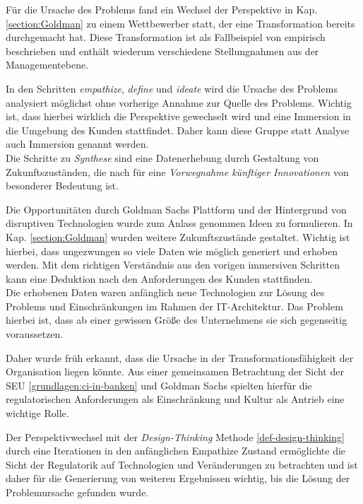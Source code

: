 Für die Ursache des Problems fand ein Wechsel der Perspektive in Kap. \ref{section:Goldman} zu einem Wettbewerber statt, der eine Transformation bereits durchgemacht hat. Diese Transformation ist als Fallbeispiel von \citet{Gupta:2017} empirisch beschrieben und enthält wiederum verschiedene Stellungnahmen aus der Managementebene.

In den Schritten \emph{empathize}, \emph{define} und \emph{ideate} wird die Ursache des Problems analysiert möglichst ohne vorherige Annahme zur Quelle des Problems. Wichtig ist, dass hierbei wirklich die Perspektive gewechselt wird und eine Immersion in die Umgebung des Kunden stattfindet. Daher kann diese Gruppe statt Analyse \cite{yüksel:digit} auch Immersion genannt werden. 
\medskip
\\
Die Schritte zu \emph{Synthese} sind eine Datenerhebung \cite[S. 61]{yüksel:digit} durch Gestaltung von Zukunftszuständen, die nach \citet[S. 14]{Alt2017} für eine \emph{Vorwegnahme künftiger Innovationen} von besonderer Bedeutung ist. 

Die Opportunitäten durch Goldman Sachs Plattform \cite{Gupta:2017} und der Hintergrund von disruptiven Technologien \cite{Fernandez:2020} wurde zum Anlass genommen Ideen zu formulieren. In Kap. \ref{section:Goldman} wurden weitere Zukunftszustände gestaltet.
Wichtig ist hierbei, dass ungezwungen so viele Daten wie möglich generiert und erhoben werden. Mit dem richtigen Verständnis aus den vorigen immersiven Schritten kann eine Deduktion nach den Anforderungen des Kunden stattfinden. 
\medskip
\\
Die erhobenen Daten waren anfänglich neue Technologien zur Lösung des Problems und Einschränkungen im Rahmen der IT-Architektur. Das Problem hierbei ist, dass ab einer gewissen Größe des Unternehmens sie sich gegenseitig voraussetzen. 

Daher wurde früh erkannt, dass die Ursache in der Transformationsfähigkeit der Organisation liegen könnte. Aus einer gemeinsamen Betrachtung der Sicht der \ac{SEU} \ref{grundlagen:ci-in-banken} und Goldman Sachs \cite{Gupta:2017} spielten hierfür die regulatorischen Anforderungen als Einschränkung und Kultur als Antrieb eine wichtige Rolle. 

Der Perspektivwechsel mit der \emph{Design-Thinking} Methode \ref{def-design-thinking} durch eine Iterationen in den anfänglichen Empathize Zustand ermöglichte die Sicht der Regulatorik auf Technologien und Veränderungen zu betrachten und ist daher für die Generierung von weiteren Ergebnissen wichtig, bis die Lösung der Problemursache gefunden wurde.
